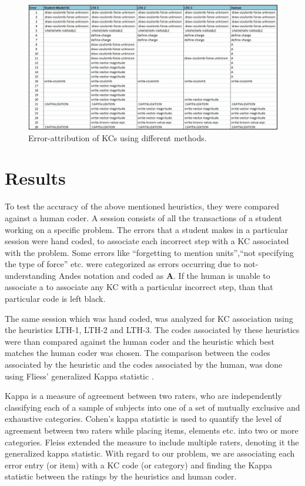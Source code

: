 \documentclass[conference]{IEEEtran}
\begin{document}
\begin{figure}
\centering
\includegraphics[scale=0.672]{Compare.jpg}
\caption{Error-attribution of KCs using different methods.}
\label{Compare}
\end{figure}

\section{Results}

To test the accuracy of the above mentioned heuristics, they were compared against a human coder. A session consists of all the transactions of a student working on a specific problem. The errors that a student makes in a particular session were hand coded, to associate each incorrect step with a KC associated with the problem. Some errors like ``forgetting to mention units'',``not specifying the type of force'' etc. were categorized as errors occurring due to not-understanding Andes notation and coded as \textbf{A}. If the human is unable to associate a to associate any KC with a particular incorrect step, than that particular code is left black.

The same session which was hand coded, was analyzed for KC association using the heuristics LTH-1, LTH-2 and LTH-3. The codes associated by these heuristics were than compared against the human coder and the heuristic which best matches the human coder was chosen. The comparison between the codes associated by the heuristic and the codes associated by the human, was done using Fliess' generalized Kappa statistic \cite{Fliess}.

Kappa is a measure of agreement between two raters, who are independently classifying each of a sample of subjects into one of a set of mutually exclusive and exhaustive categories. Cohen's \cite{Cohen} kappa statistic is used to quantify the level of agreement between two raters while placing items, elements etc. into two or more categories. Fleiss \cite{Fliess} extended the measure to include multiple raters, denoting it the generalized kappa statistic. With regard to our problem, we are associating each error entry (or item) with a KC code (or category) and finding the Kappa statistic between the ratings by the heuristics and human coder.
\end{document}
